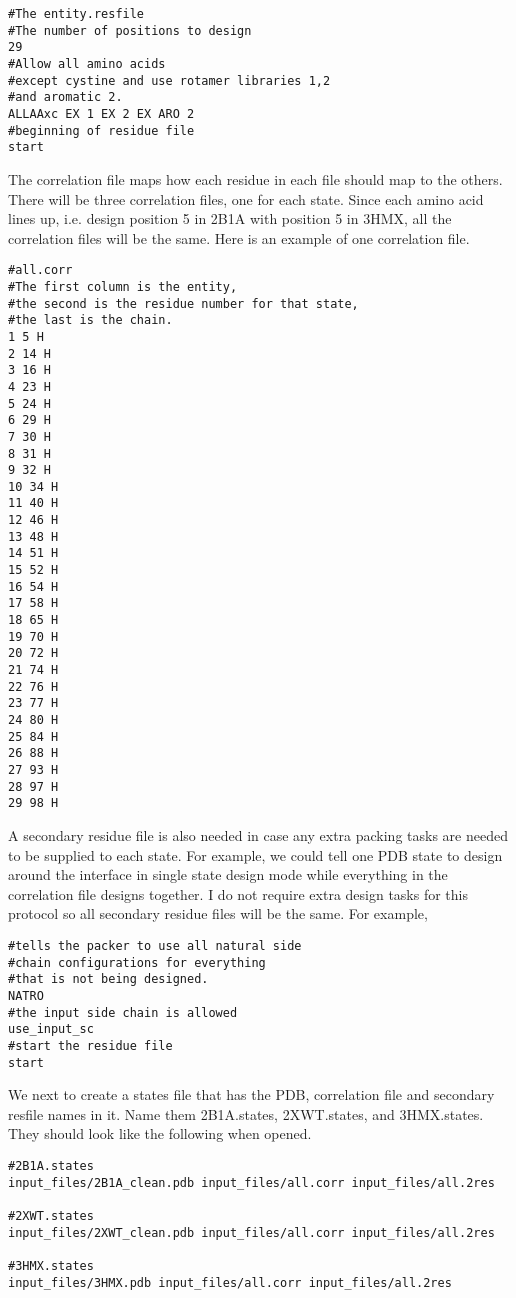 \begin{lstlisting}
#The entity.resfile
#The number of positions to design
29
#Allow all amino acids
#except cystine and use rotamer libraries 1,2
#and aromatic 2.
ALLAAxc EX 1 EX 2 EX ARO 2
#beginning of residue file
start
\end{lstlisting}

The correlation file maps how each residue in each file should map to the others. There will be three correlation files, one for each state. Since each amino acid lines up, i.e. design position 5 in 2B1A with position 5 in 3HMX, all the correlation files will be the same. Here is an example of one correlation file.

\begin{lstlisting}[breaklines=true]
#all.corr
#The first column is the entity,
#the second is the residue number for that state,
#the last is the chain.
1 5 H
2 14 H
3 16 H
4 23 H
5 24 H
6 29 H
7 30 H
8 31 H
9 32 H
10 34 H
11 40 H
12 46 H
13 48 H
14 51 H
15 52 H
16 54 H
17 58 H
18 65 H
19 70 H
20 72 H
21 74 H
22 76 H
23 77 H
24 80 H
25 84 H
26 88 H
27 93 H
28 97 H
29 98 H
\end{lstlisting}
A secondary residue file is also needed in case any extra packing tasks are needed to be supplied to each state. For example, we could tell one PDB state to design around the interface in single state design mode while everything in the correlation file designs together. I do not require extra design tasks for this protocol so all secondary residue files will be the same. For example,

\begin{lstlisting}[breaklines=true]
#tells the packer to use all natural side
#chain configurations for everything
#that is not being designed.
NATRO
#the input side chain is allowed
use_input_sc
#start the residue file
start
\end{lstlisting}

We next to create a states file that has the PDB, correlation file and secondary resfile names in it. Name them 2B1A.states, 2XWT.states, and 3HMX.states. They should look like the following when opened.

\begin{lstlisting}[brealines=true]
#2B1A.states
input_files/2B1A_clean.pdb input_files/all.corr input_files/all.2res

#2XWT.states
input_files/2XWT_clean.pdb input_files/all.corr input_files/all.2res

#3HMX.states
input_files/3HMX.pdb input_files/all.corr input_files/all.2res
\end{lstlisting}

